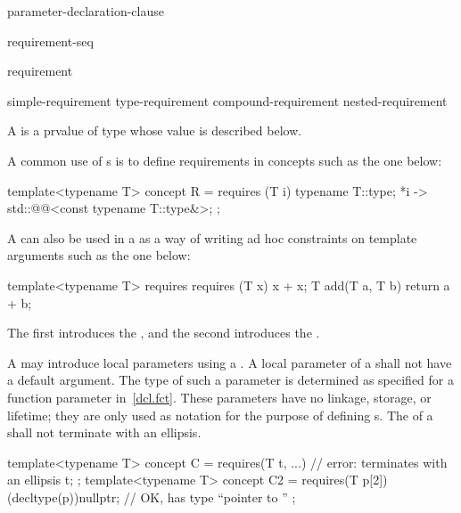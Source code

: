\begin{bnf}
\br
    \terminal{(} parameter-declaration-clause \terminal{)}
\end{bnf}

\begin{bnf}
\br
    \terminal{\{} requirement-seq \terminal{\}}
\end{bnf}

\begin{bnf}
\br
    requirement 
\end{bnf}

\begin{bnf}
\br
    simple-requirement\br
    type-requirement\br
    compound-requirement\br
    nested-requirement
\end{bnf}

\pnum
A  is a prvalue of type 
whose value is described below.

\pnum
\begin{example}
A common use of s is to define
requirements in concepts such as the one below:
\begin{codeblock}
template<typename T>
  concept R = requires (T i) {
    typename T::type;
    {*i} -> std::@@<const typename T::type&>;
  };
\end{codeblock}
A  can also be used in a
 as a way of writing ad hoc
constraints on template arguments such as the one below:
\begin{codeblock}
template<typename T>
  requires requires (T x) { x + x; }
    T add(T a, T b) { return a + b; }
\end{codeblock}
The first  introduces the
, and the second
introduces the .
\end{example}

\pnum
A  may introduce local parameters using a
.
A local parameter of a  shall not have a
default argument.
The type of such a parameter is determined as specified for
a function parameter in~\ref{dcl.fct}.
These parameters have no linkage, storage, or lifetime; they are only used
as notation for the purpose of defining s.
The  of a
shall not terminate with an ellipsis.
\begin{example}
\begin{codeblock}
template<typename T>
concept C = requires(T t, ...) {    // error: terminates with an ellipsis
  t;
};
template<typename T>
concept C2 = requires(T p[2]) {
  (decltype(p))nullptr;             // OK,  has type ``pointer to ''
};
\end{codeblock}
\end{example}

